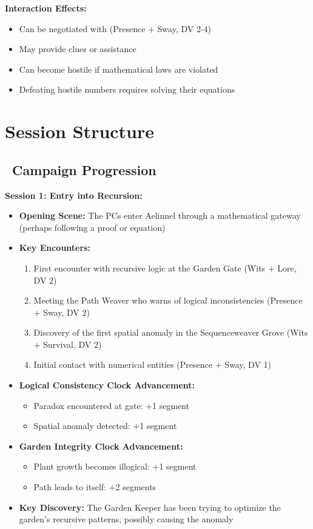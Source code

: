 \documentclass[11pt]{article}
\begin{document}
\textbf{Interaction Effects:}
\begin{itemize}
    \item Can be negotiated with (Presence + Sway, DV 2-4)
    \item May provide clues or assistance
    \item Can become hostile if mathematical laws are violated
    \item Defeating hostile numbers requires solving their equations
\end{itemize}

\section{Session Structure}

\subsection*{\faBook\ Campaign Progression}

\textbf{Session 1: Entry into Recursion:}
\begin{itemize}
    \item \textbf{Opening Scene:} The PCs enter Aelinnel through a mathematical gateway (perhaps following a proof or equation)
    \item \textbf{Key Encounters:}
    \begin{enumerate}
        \item First encounter with recursive logic at the Garden Gate (Wits + Lore, DV 2)
        \item Meeting the Path Weaver who warns of logical inconsistencies (Presence + Sway, DV 2)
        \item Discovery of the first spatial anomaly in the Sequenceweaver Grove (Wits + Survival, DV 2)
        \item Initial contact with numerical entities (Presence + Sway, DV 1)
    \end{enumerate}
    \item \textbf{Logical Consistency Clock Advancement:}
    \begin{itemize}
        \item Paradox encountered at gate: +1 segment
        \item Spatial anomaly detected: +1 segment
    \end{itemize}
    \item \textbf{Garden Integrity Clock Advancement:}
    \begin{itemize}
        \item Plant growth becomes illogical: +1 segment
        \item Path leads to itself: +2 segments
    \end{itemize}
    \item \textbf{Key Discovery:} The Garden Keeper has been trying to optimize the garden's recursive patterns, possibly causing the anomaly
\end{itemize}
\end{document}
